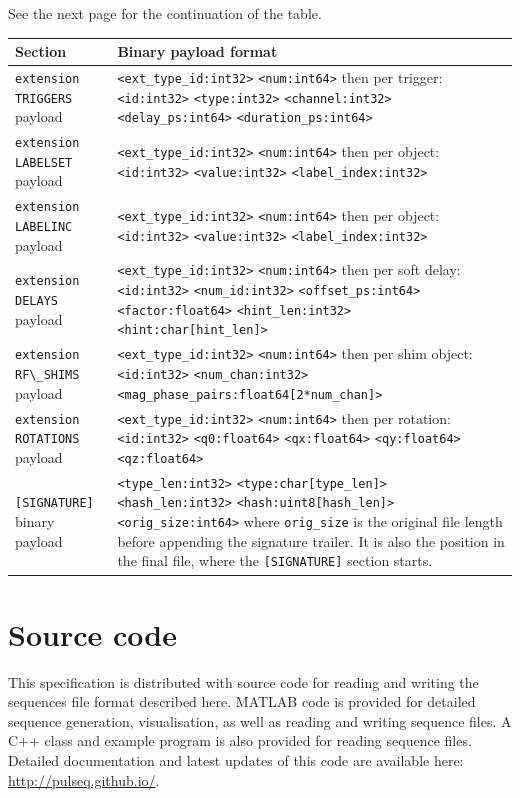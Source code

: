 \documentclass{article}
\begin{document}
See the next page for the continuation of the table.
\begin{center}
\begin{tabularx}{\textwidth}{lX}
\toprule
Section & Binary payload format \\
\midrule
\verb.extension TRIGGERS. payload & \verb.<ext_type_id:int32>. \verb.<num:int64>. then per trigger: \verb.<id:int32>. \verb.<type:int32>. \verb.<channel:int32>. \verb.<delay_ps:int64>. \verb.<duration_ps:int64>. \\
\verb.extension LABELSET. payload & \verb.<ext_type_id:int32>. \verb.<num:int64>. then per object: \verb.<id:int32>. \verb.<value:int32>. \verb.<label_index:int32>. \\
\verb.extension LABELINC. payload & \verb.<ext_type_id:int32>. \verb.<num:int64>. then per object: \verb.<id:int32>. \verb.<value:int32>. \verb.<label_index:int32>. \\
\verb.extension DELAYS. payload & \verb.<ext_type_id:int32>. \verb.<num:int64>. then per soft delay: \verb.<id:int32>. \verb.<num_id:int32>. \verb.<offset_ps:int64>. \verb.<factor:float64>. \verb.<hint_len:int32>. \verb.<hint:char[hint_len]>. \\
\verb.extension RF\_SHIMS. payload & \verb.<ext_type_id:int32>. \verb.<num:int64>. then per shim object: \verb.<id:int32>. \verb.<num_chan:int32>. \verb.<mag_phase_pairs:float64[2*num_chan]>. \\
\verb.extension ROTATIONS. payload & \verb.<ext_type_id:int32>. \verb.<num:int64>. then per rotation: \verb.<id:int32>. \verb.<q0:float64>. \verb.<qx:float64>. \verb.<qy:float64>. \verb.<qz:float64>. \\
\verb.[SIGNATURE]. binary payload & \verb.<type_len:int32>. \verb.<type:char[type_len]>. \verb.<hash_len:int32>. \verb.<hash:uint8[hash_len]>. \verb.<orig_size:int64>. where \verb.orig_size. is the original file length before appending the signature trailer. It is also the position in the final file, where the \verb.[SIGNATURE]. section starts.\\
\bottomrule
\end{tabularx}
\end{center}

\section{Source code}
This specification is distributed with source code for reading and writing the sequences file format described here. MATLAB code is provided for detailed sequence generation, visualisation, as well as reading and writing sequence files. A C++ class and example program is also provided for reading sequence files. Detailed documentation and latest updates of this code are available here: \url{http://pulseq.github.io/}.
\end{document}
